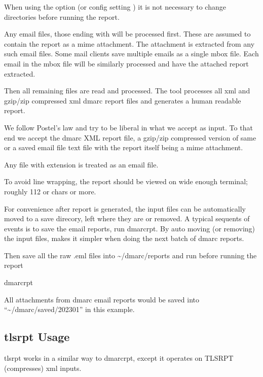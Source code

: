 \documentclass[letterpaper,10pt,english]{sphinxmanual}
\begin{document}
\sphinxAtStartPar
When using the  option (or config setting ) it is not necessary
to change directories before running the report.

\sphinxAtStartPar
Any email files, those ending with  will be processed first. These are assumed to
contain the report as a mime attachment. The attachment is extracted from any such email
files. Some mail clients save multiple emails as a single mbox file. Each email in the mbox
file will be similarly processed and have the attached report extracted.

\sphinxAtStartPar
Then all remaining files are read and processed. The tool processes all xml
and gzip/zip compressed xml dmarc report files and generates a human readable report.

\sphinxAtStartPar
We follow Postel’s law and try to be liberal in what we accept as input. To that end
we accept the dmarc XML report file, a gzip/zip compressed version of same or a saved email
file text file with the report itself being a mime attachment.

\sphinxAtStartPar
Any file with extension  is treated as an email file.

\sphinxAtStartPar
To avoid line wrapping, the report should be viewed on wide enough terminal; roughly 112 or chars or more.

\sphinxAtStartPar
For convenience after report is generated, the input files can be automatically moved to a save
direcory, left where they are or removed. A typical sequents of events is to save
the email reports, run dmarc\sphinxhyphen{}rpt.  By auto moving (or removing) the input files, makes it simpler
when doing the next batch of dmarc reports.

\sphinxAtStartPar
Then save all the raw .eml files into \textasciitilde{}/dmarc/reports and run before running the report

\begin{sphinxVerbatim}[commandchars=\\\{\}]
dmarc\PYGZhy{}rpt
\end{sphinxVerbatim}

\sphinxAtStartPar
All attachments from dmarc email reports would be saved into “\textasciitilde{}/dmarc/saved/2023\sphinxhyphen{}01”
in this example.


\subsection{tls\sphinxhyphen{}rpt Usage}
\label{\detokenize{README:tls-rpt-usage}}
\sphinxAtStartPar
tls\sphinxhyphen{}rpt works in a similar way to dmarc\sphinxhyphen{}rpt, except it operates on TLS\sphinxhyphen{}RPT (compresses) xml inputs.
\end{document}
